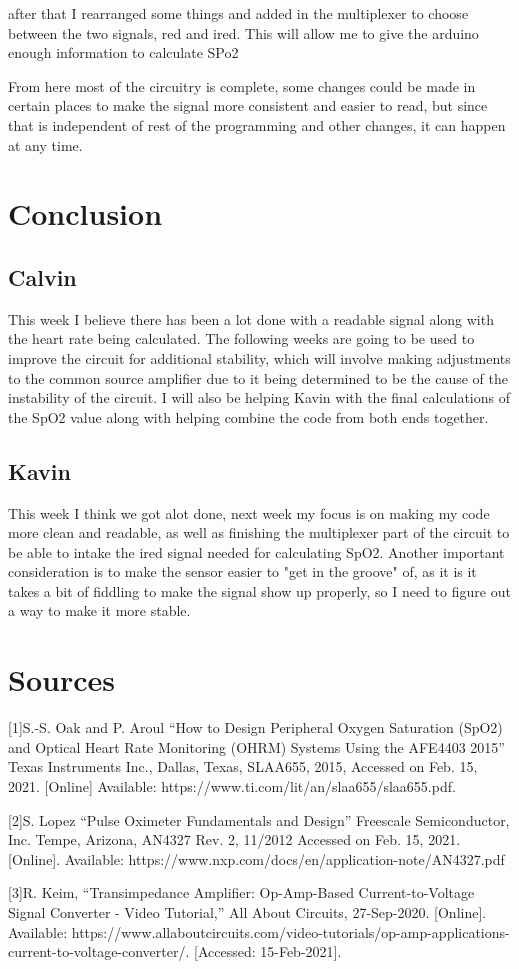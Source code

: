 \documentclass{article}
\begin{document}
after that I rearranged some things and added in the multiplexer to choose between the two signals, red and ired. This will allow me to give the arduino enough information to calculate SPo2
\begin{center}
\end{center}
From here most of the circuitry is complete, some changes could be made in certain places to make the signal more consistent and easier to read, but since that is independent of rest of the programming and other changes, it can happen at any time.
\newpage
\section{Conclusion}
\subsection{Calvin}
This week I believe there has been a lot done with a readable signal along with the heart rate being calculated. The following weeks are going to be used to improve the circuit for additional stability, which will involve making adjustments to the common source amplifier due to it being determined to be the cause of the instability of the circuit. I will also be helping Kavin with the final calculations of the SpO2 value along with helping combine the code from both ends together.
\subsection{Kavin}
This week I think  we got alot done, next week my focus is on making my code more clean and readable, as well as finishing the multiplexer part of the circuit to be able to intake the ired signal needed for calculating SpO2. Another important consideration is to make the sensor easier to "get in the groove" of, as it is it takes a bit of fiddling to make the signal show up properly, so I need to figure out a way to make it more stable.
\newpage
\section{Sources}
    [1]S.-S. Oak and P. Aroul “How to Design Peripheral Oxygen Saturation (SpO2) and Optical Heart Rate Monitoring (OHRM) Systems Using the AFE4403 2015” Texas Instruments Inc., Dallas, Texas, SLAA655, 2015, Accessed on Feb. 15, 2021. [Online] Available: https://www.ti.com/lit/an/slaa655/slaa655.pdf.
    
    [2]S. Lopez “Pulse Oximeter Fundamentals and Design” Freescale Semiconductor, Inc. Tempe, Arizona, AN4327 Rev. 2, 11/2012 Accessed on Feb. 15, 2021. [Online]. Available: https://www.nxp.com/docs/en/application-note/AN4327.pdf
    
    [3]R. Keim, “Transimpedance Amplifier: Op-Amp-Based Current-to-Voltage Signal Converter - Video Tutorial,” All About Circuits, 27-Sep-2020. [Online]. Available: https://www.allaboutcircuits.com/video-tutorials/op-amp-applications-current-to-voltage-converter/. [Accessed: 15-Feb-2021]. 
    
\end{document}
